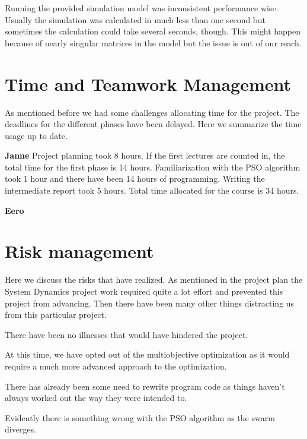 \documentclass[twoside]{article}
\begin{document}
\begin{multicols}{2}
Running the provided simulation model was inconsistent performance wise. Usually the simulation was calculated in much less than one second but sometimes the calculation could take several seconds, though. This might happen because of nearly singular matrices in the model but the issue is out of our reach.



\section{Time and Teamwork Management}

As mentioned before we had some challenges allocating time for the project. The deadlines for the different phases have been delayed. Here we summarize the time usage up to date.

\textbf{Janne} Project planning took 8 hours. If the first lectures are counted in, the total time for the first phase is 14 hours. Familiarization with the PSO algorithm took 1 hour and there have been 14 hours of programming. Writing the intermediate report took 5 hours. Total time allocated for the course is 34 hours.

\textbf{Eero}








\section{Risk management}

Here we discuss the risks that have realized. As mentioned in the project plan the System Dynamics project work required quite a lot effort and prevented this project from advancing. Then there have been many other things distracting us from this particular project.

There have been no illnesses that would have hindered the project.

At this time, we have opted out of the multiobjective optimization as it would require a much more advanced approach to the optimization.

There has already been some need to rewrite program code as things haven't always worked out the way they were intended to.

Evidently there is something wrong with the PSO algorithm as the swarm diverges. 


\end{multicols}
\end{document}
